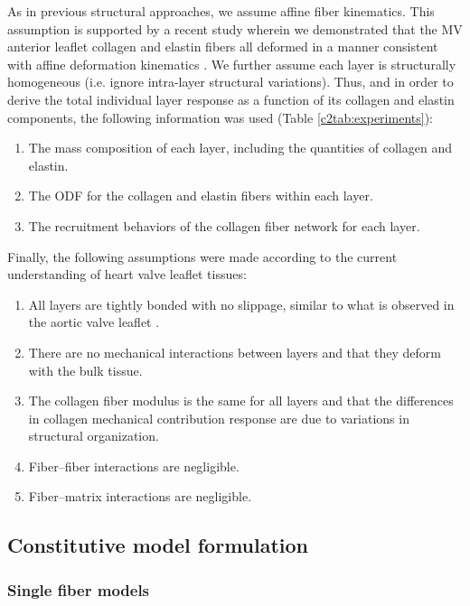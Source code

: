     As in previous structural approaches, we assume affine fiber kinematics. This assumption is supported by a recent study wherein we demonstrated that the MV anterior leaflet collagen and elastin fibers all deformed in a manner consistent with affine deformation kinematics \cite{lee_presence_2015}. We further assume each layer is structurally homogeneous (i.e. ignore intra-layer structural variations). Thus, and in order to derive the total individual layer response as a function of its collagen and elastin components, the following information was used (Table \ref{c2tab:experiments}):
        \begin{enumerate}
            \item The mass composition of each layer, including the quantities of collagen and elastin.
            \item The ODF for the collagen and elastin fibers within each layer.
            \item The recruitment behaviors of the collagen fiber network for each layer.
        \end{enumerate}
    Finally, the following assumptions were made according to the current understanding of heart valve leaflet tissues:
        \begin{enumerate}
            \item All layers are tightly bonded with no slippage, similar to what is observed in the aortic valve leaflet \cite{buchanan_interlayer_2013}.
            \item There are no mechanical interactions between layers and that they deform with the bulk tissue.
            \item The collagen fiber modulus is the same for all layers and that the differences in collagen mechanical contribution response are due to variations in structural organization.
            \item Fiber–fiber interactions are negligible.
            \item Fiber–matrix interactions are negligible.
        \end{enumerate}




\subsection{Constitutive model formulation}

\subsubsection{Single fiber models}

